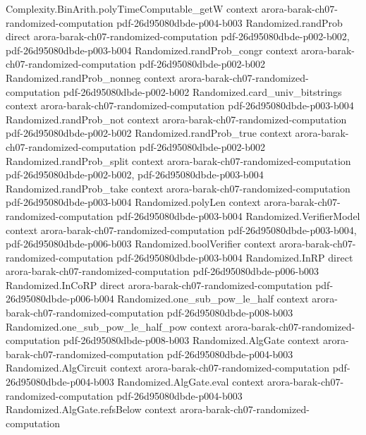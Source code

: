 \begin{theorem}
  {Complexity.BinArith.polyTimeComputable_getW}
  {context}
  {arora-barak-ch07-randomized-computation}
  {pdf-26d95080dbde-p004-b003}
\proofstep
  {Randomized.randProb}
  {direct}
  {arora-barak-ch07-randomized-computation}
  {pdf-26d95080dbde-p002-b002,
    pdf-26d95080dbde-p003-b004}
\proofstep
  {Randomized.randProb_congr}
  {context}
  {arora-barak-ch07-randomized-computation}
  {pdf-26d95080dbde-p002-b002}
\proofstep
  {Randomized.randProb_nonneg}
  {context}
  {arora-barak-ch07-randomized-computation}
  {pdf-26d95080dbde-p002-b002}
\proofstep
  {Randomized.card_univ_bitstrings}
  {context}
  {arora-barak-ch07-randomized-computation}
  {pdf-26d95080dbde-p003-b004}
\proofstep
  {Randomized.randProb_not}
  {context}
  {arora-barak-ch07-randomized-computation}
  {pdf-26d95080dbde-p002-b002}
\proofstep
  {Randomized.randProb_true}
  {context}
  {arora-barak-ch07-randomized-computation}
  {pdf-26d95080dbde-p002-b002}
\proofstep
  {Randomized.randProb_split}
  {context}
  {arora-barak-ch07-randomized-computation}
  {pdf-26d95080dbde-p002-b002,
    pdf-26d95080dbde-p003-b004}
\proofstep
  {Randomized.randProb_take}
  {context}
  {arora-barak-ch07-randomized-computation}
  {pdf-26d95080dbde-p003-b004}
\proofstep
  {Randomized.polyLen}
  {context}
  {arora-barak-ch07-randomized-computation}
  {pdf-26d95080dbde-p003-b004}
\proofstep
  {Randomized.VerifierModel}
  {context}
  {arora-barak-ch07-randomized-computation}
  {pdf-26d95080dbde-p003-b004,
    pdf-26d95080dbde-p006-b003}
\proofstep
  {Randomized.boolVerifier}
  {context}
  {arora-barak-ch07-randomized-computation}
  {pdf-26d95080dbde-p003-b004}
\proofstep
  {Randomized.InRP}
  {direct}
  {arora-barak-ch07-randomized-computation}
  {pdf-26d95080dbde-p006-b003}
\proofstep
  {Randomized.InCoRP}
  {direct}
  {arora-barak-ch07-randomized-computation}
  {pdf-26d95080dbde-p006-b004}
\proofstep
  {Randomized.one_sub_pow_le_half}
  {context}
  {arora-barak-ch07-randomized-computation}
  {pdf-26d95080dbde-p008-b003}
\proofstep
  {Randomized.one_sub_pow_le_half_pow}
  {context}
  {arora-barak-ch07-randomized-computation}
  {pdf-26d95080dbde-p008-b003}
\proofstep
  {Randomized.AlgGate}
  {context}
  {arora-barak-ch07-randomized-computation}
  {pdf-26d95080dbde-p004-b003}
\proofstep
  {Randomized.AlgCircuit}
  {context}
  {arora-barak-ch07-randomized-computation}
  {pdf-26d95080dbde-p004-b003}
\proofstep
  {Randomized.AlgGate.eval}
  {context}
  {arora-barak-ch07-randomized-computation}
  {pdf-26d95080dbde-p004-b003}
\proofstep
  {Randomized.AlgGate.refsBelow}
  {context}
  {arora-barak-ch07-randomized-computation}

\end{theorem}
